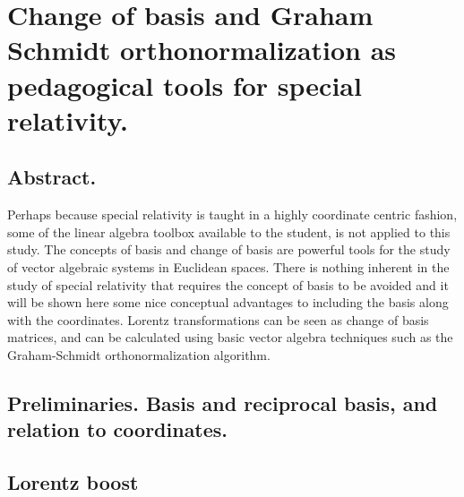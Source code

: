 
%

\chapter{Change of basis and Graham Schmidt orthonormalization as pedagogical tools for special relativity.}
\label{chap:grahamSchmidtLorentz}
{}
\date{April 14, 2011}

\beginArtWithToc

\section{Abstract.}

Perhaps because special relativity is taught in a highly coordinate centric fashion, some of the linear algebra toolbox available to the student, is not applied to this study.  The concepts of basis and change of basis are powerful tools for the study of vector algebraic systems in Euclidean spaces.  There is nothing inherent in the study of special relativity that requires the concept of basis to be avoided and it will be shown here some nice conceptual advantages to including the basis along with the coordinates.  Lorentz transformations can be seen as change of basis matrices, and can be calculated using basic vector algebra techniques such as the Graham-Schmidt orthonormalization algorithm.

\section{Preliminaries.  Basis and reciprocal basis, and relation to coordinates.}

\section{Lorentz boost}


\EndArticle
